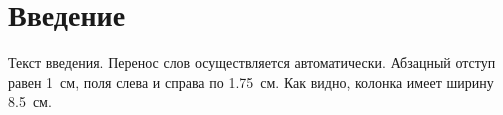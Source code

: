 \section*{Введение}
Текст введения. Перенос слов осуществляется автоматически. Абзацный отступ равен 1~см, поля слева и справа по 1.75~см. Как видно, колонка имеет ширину 8.5~см. 